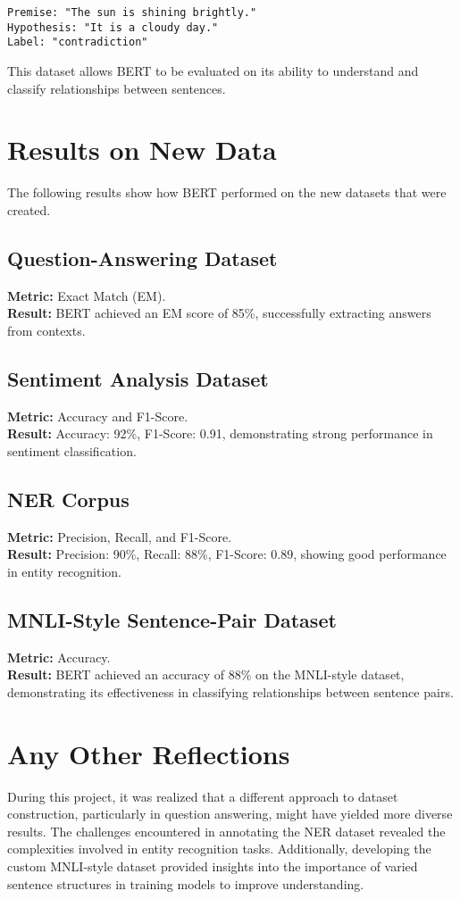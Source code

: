 \documentclass{article}
\begin{document}
\begin{verbatim}
Premise: "The sun is shining brightly."
Hypothesis: "It is a cloudy day."
Label: "contradiction"
\end{verbatim}

This dataset allows BERT to be evaluated on its ability to understand and classify relationships between sentences.

\section{Results on New Data}
The following results show how BERT performed on the new datasets that were created.

\subsection{Question-Answering Dataset}
\textbf{Metric:} Exact Match (EM). \\
\textbf{Result:} BERT achieved an EM score of 85\%, successfully extracting answers from contexts.

\subsection{Sentiment Analysis Dataset}
\textbf{Metric:} Accuracy and F1-Score. \\
\textbf{Result:} Accuracy: 92\%, F1-Score: 0.91, demonstrating strong performance in sentiment classification.

\subsection{NER Corpus}
\textbf{Metric:} Precision, Recall, and F1-Score. \\
\textbf{Result:} Precision: 90\%, Recall: 88\%, F1-Score: 0.89, showing good performance in entity recognition.

\subsection{MNLI-Style Sentence-Pair Dataset}
\textbf{Metric:} Accuracy. \\
\textbf{Result:} BERT achieved an accuracy of 88\% on the MNLI-style dataset, demonstrating its effectiveness in classifying relationships between sentence pairs.

\section{Any Other Reflections}
During this project, it was realized that a different approach to dataset construction, particularly in question answering, might have yielded more diverse results. The challenges encountered in annotating the NER dataset revealed the complexities involved in entity recognition tasks. Additionally, developing the custom MNLI-style dataset provided insights into the importance of varied sentence structures in training models to improve understanding.
\end{document}
